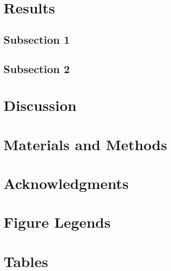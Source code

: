 \documentclass[10pt]{article}
\begin{document}
\section*{Results}

\subsection*{Subsection 1}

\subsection*{Subsection 2}

\section*{Discussion}

\section*{Materials and Methods}

\section*{Acknowledgments}





\section*{Figure Legends}


\section*{Tables}
\end{document}

